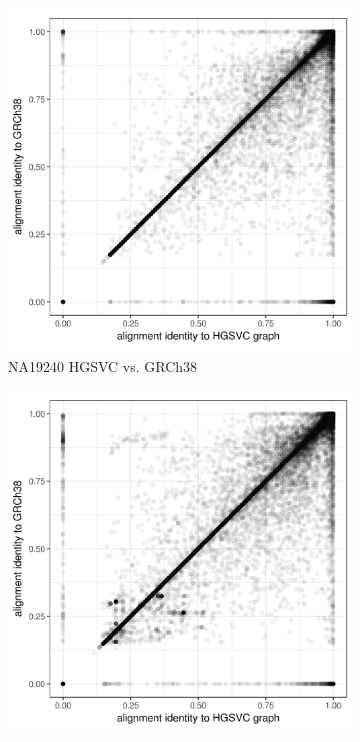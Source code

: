 \documentclass[a4paper,12pt,numbered,oneside]{Classes/PhDThesisPSnPDF}
\begin{document}
\begin{figure}[htbp!] 
  \centering
  \begin{subfigure}[t]{0.49\textwidth}
    \includegraphics[width=1.0\textwidth]{Chapter3/Figs/NA19240_hg38_vs_HGSVC_scatter.png}
    \caption{NA19240 HGSVC vs. GRCh38}
    \label{subfig:hgsvc_NA19240_scatter}
  \end{subfigure}
  \begin{subfigure}[t]{0.49\textwidth}
    \includegraphics[width=1.0\textwidth]{Chapter3/Figs/NA24385_hg38_vs_HGSVC_scatter.png}

\end{subfigure}
\end{figure}
\end{document}
